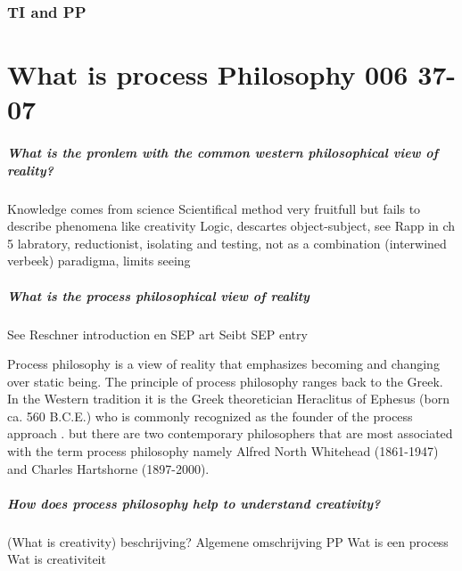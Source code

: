 \documentclass[a4paper]{Thesis}
\begin{document}
	\subsection{TI and PP}
	
	
	

\chapter{What is process Philosophy 006 37-07}

\paragraph{What is the pronlem with the common western philosophical view of reality?}
Knowledge comes from science
Scientifical method very fruitfull but fails to describe phenomena like creativity
Logic, descartes object-subject, see Rapp in ch 5
labratory, reductionist, isolating and testing, not as a combination (interwined verbeek)
paradigma, limits seeing

\paragraph{What is the process philosophical view of reality}
See Reschner introduction en SEP art \cite{Rescher-2012-sep}
Seibt SEP entry \cite{Seibt-2013-sep}


Process philosophy is a view of reality that emphasizes becoming and changing over static being. The principle of process philosophy ranges back to the Greek.
In the Western tradition it is the Greek theoretician Heraclitus of Ephesus (born ca. 560 B.C.E.) who is commonly recognized as the founder of the process approach \cite{Seibt-2013-sep}. 
but there are two contemporary philosophers that are most associated with the term process philosophy namely Alfred North Whitehead (1861-1947) and Charles Hartshorne (1897-2000).



\paragraph{How does process philosophy help to understand creativity?}

\paragragph(What is creativity)
beschrijving?
Algemene omschrijving PP
Wat is een process
Wat is creativiteit
\end{document}
